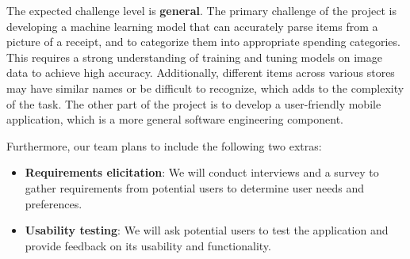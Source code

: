\documentclass{article}
\begin{document}
The expected challenge level is \textbf{general}. The primary challenge of the
project is developing a machine learning model that can accurately parse items
from a picture of a receipt, and to categorize them into appropriate spending
categories. This requires a strong understanding of training and tuning models
on image data to achieve high accuracy. Additionally, different items across
various stores may have similar names or be difficult to recognize, which adds
to the complexity of the task. The other part of the project is to develop a
user-friendly mobile application, which is a more general software engineering
component.

Furthermore, our team plans to include the following two extras:
\begin{itemize}
    \item \textbf{Requirements elicitation}: We will conduct interviews and a
    survey to gather requirements from potential users to determine user needs
    and preferences.
    \item \textbf{Usability testing}: We will ask potential users to test the
    application and provide feedback on its usability and functionality.

\end{itemize}

\newpage{}
\end{document}
